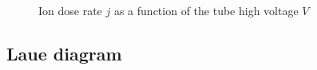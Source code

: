 \documentclass{scrartcl}
\begin{document}
\begin{figure}[!ht]
    \centering
    \caption{Ion dose rate $j$ as a function of the tube high voltage $V$}
    \label{fig:IonDoseRateAsFunctionOfTubeHighVoltage}
\end{figure}
\FloatBarrier

\clearpage

\subsection{Laue diagram}
\end{document}
